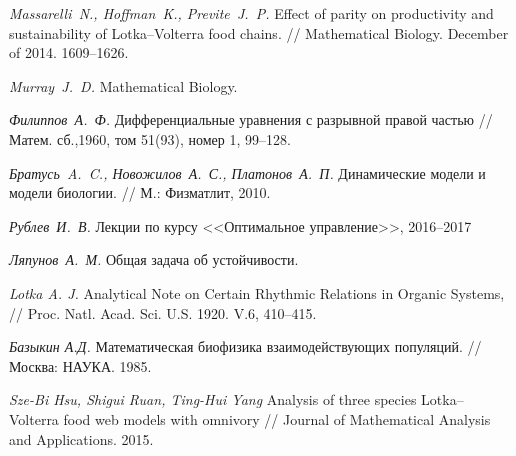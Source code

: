 \documentclass[11pt]{article}
\theoremstyle{definition}
\begin{document}
\clearpage
\newpage
\begin{thebibliography}{0}

     {\it Massarelli~N., Hoffman~K., Previte~J.~P.} Effect of parity on productivity and sustainability of Lotka–Volterra food chains. // Mathematical Biology. December of 2014. 1609--1626.
    
     {\it Murray~J.~D.} Mathematical Biology.
    
     {\it Филиппов~А.~Ф.} Дифференциальные уравнения с разрывной правой частью // Матем. сб.,1960, том 51(93), номер 1, 99–128.
    
     {\it Братусь~A.~C., Новожилов~А.~С., Платонов~А.~П.} Динамические модели и модели биологии. // М.: Физматлит, 2010.
    
     {\it Рублев~И.~В.} Лекции по курсу <<Оптимальное управление>>, 2016--2017      
    
     {\it Ляпунов~А.~М.} Общая задача об устойчивости.
    
     {\it Lotka A. J.} Analytical Note on Certain Rhythmic Relations in Organic Systems,  // Proc.
Natl. Acad. Sci. U.S. 1920. V.6, 410–415.
    
     {\it Базыкин А.Д.} Математическая биофизика взаимодействующих популяций. // Москва: НАУКА. 1985.
    
     {\it Sze-Bi Hsu, Shigui Ruan, Ting-Hui Yang} Analysis of three species Lotka–Volterra food web models with omnivory // Journal of Mathematical Analysis and Applications. 2015.
\end{thebibliography}

    
\end{document}
